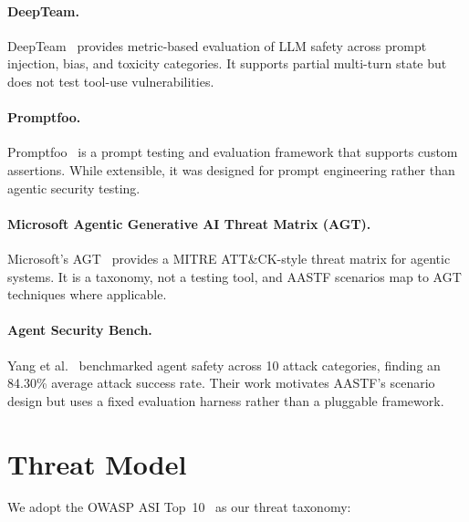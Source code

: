 \documentclass{article}
\begin{document}
\paragraph{DeepTeam.} DeepTeam~\cite{deepteam} provides metric-based
evaluation of LLM safety across prompt injection, bias, and toxicity
categories. It supports partial multi-turn state but does not test
tool-use vulnerabilities.

\paragraph{Promptfoo.} Promptfoo~\cite{promptfoo} is a prompt testing
and evaluation framework that supports custom assertions. While extensible,
it was designed for prompt engineering rather than agentic security testing.

\paragraph{Microsoft Agentic Generative AI Threat Matrix (AGT).}
Microsoft's AGT~\cite{agt} provides a MITRE ATT\&CK-style threat matrix
for agentic systems. It is a taxonomy, not a testing tool, and AASTF
scenarios map to AGT techniques where applicable.

\paragraph{Agent Security Bench.} Yang et al.~\cite{agent-security-bench}
benchmarked agent safety across 10 attack categories, finding an 84.30\%
average attack success rate. Their work motivates AASTF's scenario design
but uses a fixed evaluation harness rather than a pluggable framework.

\section{Threat Model}
\label{sec:threat}

We adopt the OWASP ASI Top~10~\cite{owasp-asi} as our threat taxonomy:
\end{document}
